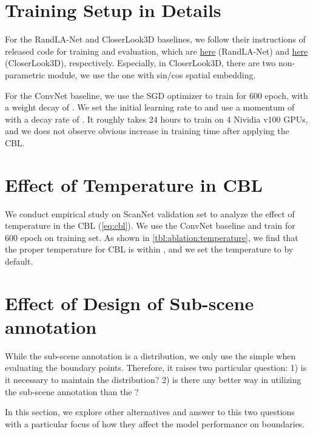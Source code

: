 \documentclass[10pt,twocolumn,letterpaper]{article}
\begin{document}
\section{Training Setup in Details}
\label{sec:sup:train}
For the RandLA-Net\cite{randlanet} and CloserLook3D\cite{closerlook} baselines, we follow their instructions of released code for training and evaluation, which are \href{https://github.com/QingyongHu/RandLA-Net}{here} (RandLA-Net) and \href{https://github.com/zeliu98/CloserLook3D}{here} (CloserLook3D), respectively. Especially, in CloserLook3D\cite{closerlook}, there are two non-parametric module, we use the one with sin/cos spatial embedding.

For the ConvNet baseline, we use the SGD optimizer to train for 600 epoch, with a weight decay of . We set the initial learning rate to  and use a momentum of  with a decay rate of . It roughly takes 24 hours to train on 4 Nividia v100 GPUs, and we does not observe obvious increase in training time after applying the CBL.

\section{Effect of Temperature in CBL}
\label{sec:sup:ablation:temperature}
We conduct empirical study on ScanNet\cite{scannet} validation set to analyze the effect of temperature  in the CBL (\cref{eq:cbl}). We use the ConvNet baseline and train for 600 epoch on training set. As shown in \cref{tbl:ablation:temperature}, we find that
the proper temperature for CBL is within , and we set the temperature to  by default.

\section{Effect of Design of Sub-scene annotation}
\label{sec:sup:argmax}
While the sub-scene annotation is a distribution, we only use the simple  when evaluating the boundary points. Therefore, it raises two particular question: 1) is it necessary to maintain the distribution? 2) is there any better way in utilizing the sub-scene annotation than the ?

In this section, we explore other alternatives and answer to this two questions with a particular focus of how they affect the model performance on boundaries.
\end{document}
